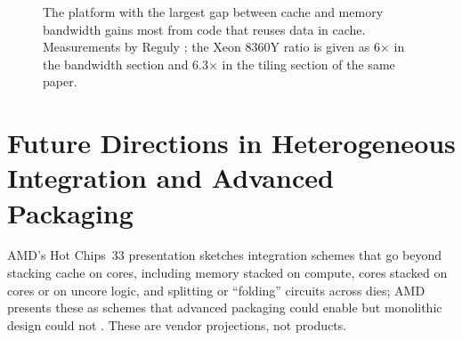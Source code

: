 \begin{figure}[htbp]
\centering
{}
\caption[Cache-to-memory bandwidth ratio and the gain from tiling (Reguly)]{The platform with the largest gap between cache and memory bandwidth gains most from code that reuses data in cache. Measurements by Reguly \cite{regulyComparativeEvaluationBandwidthbound2023}; the Xeon 8360Y ratio is given as 6$\times$ in the bandwidth section and 6.3$\times$ in the tiling section of the same paper.}
\label{fig:reguly-ratio}
\end{figure}


\section{Future Directions in Heterogeneous Integration and Advanced Packaging}
\label{sec:future}

AMD's Hot Chips~33 presentation sketches integration schemes that go beyond stacking cache on cores, including memory stacked on compute, cores stacked on cores or on uncore logic, and splitting or ``folding'' circuits across dies; AMD presents these as schemes that advanced packaging could enable but monolithic design could not \cite{swaminathanAdvancedPackagingEnabling2021}. These are vendor projections, not products.


